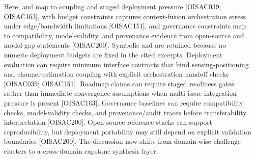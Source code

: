 {}Here,  and  map to coupling and staged deployment pressure [O\markdownRendererUnderscore{}ISAC\markdownRendererUnderscore{}039; O\markdownRendererUnderscore{}ISAC\markdownRendererUnderscore{}163],  with budget constraints captures context-fusion orchestration stress under edge/bandwidth limitations [O\markdownRendererUnderscore{}ISAC\markdownRendererUnderscore{}151], and governance constraints map to compatibility, model-validity, and provenance evidence from open-source and model-gap statements [O\markdownRendererUnderscore{}ISAC\markdownRendererUnderscore{}200]. Symbolic  and  are retained because no numeric deployment budgets are fixed in the cited excerpts.\markdownRendererInterblockSeparator
{}
\markdownRendererSectionEnd \markdownRendererSectionBegin
{}\markdownRendererInterblockSeparator
{}\markdownRendererUlBeginTight
\markdownRendererUlItem Deployment evaluation can require minimum interface contracts that bind sensing-positioning and channel-estimation coupling with explicit orchestration handoff checks [O\markdownRendererUnderscore{}ISAC\markdownRendererUnderscore{}039; O\markdownRendererUnderscore{}ISAC\markdownRendererUnderscore{}151].\markdownRendererUlItemEnd 
\markdownRendererUlItem Roadmap claims can require staged readiness gates rather than immediate convergence assumptions when multi-issue integration pressure is present [O\markdownRendererUnderscore{}ISAC\markdownRendererUnderscore{}163].\markdownRendererUlItemEnd 
\markdownRendererUlItem Governance baselines can require compatibility checks, model-validity checks, and provenance/audit traces before transferability interpretation [O\markdownRendererUnderscore{}ISAC\markdownRendererUnderscore{}200].\markdownRendererUlItemEnd 
\markdownRendererUlItem Open-source reference stacks can support reproducibility, but deployment portability may still depend on explicit validation boundaries [O\markdownRendererUnderscore{}ISAC\markdownRendererUnderscore{}200].\markdownRendererUlItemEnd 
\markdownRendererUlEndTight \markdownRendererInterblockSeparator
{}The discussion now shifts from domain-wise challenge clusters to a cross-domain capstone synthesis layer.\markdownRendererInterblockSeparator
{}
\markdownRendererSectionEnd 
\markdownRendererSectionEnd \markdownRendererSectionBegin
